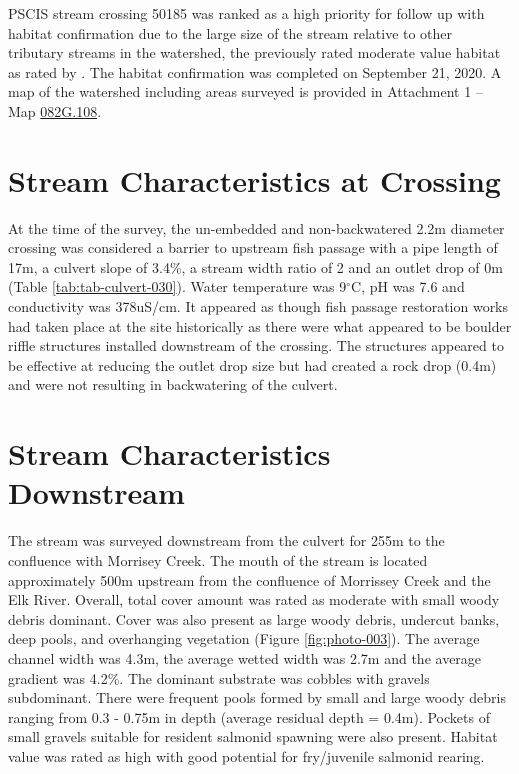 \documentclass[
]{book}
\begin{document}
PSCIS stream crossing 50185 was ranked as a high priority for follow up with habitat confirmation due to the large size of the stream relative to other tributary streams in the watershed, the previously rated moderate value habitat as rated by \citet{vastFishPassage2013}. The habitat confirmation was completed on September 21, 2020. A map of the watershed including areas surveyed is provided in Attachment 1 -- Map \href{https://hillcrestgeo.ca/outgoing/fishpassage/projects/elk/FishPassage_082G.108.pdf}{082G.108}.

\hypertarget{stream-characteristics-at-crossing-2}{%
\section*{Stream Characteristics at Crossing}\label{stream-characteristics-at-crossing-2}}

At the time of the survey, the un-embedded and non-backwatered 2.2m diameter crossing was considered a barrier to upstream fish passage with a pipe length of 17m, a culvert slope of 3.4\%, a stream width ratio of 2 and an outlet drop of 0m (Table \ref{tab:tab-culvert-030}). Water temperature was 9\(^\circ\)C, pH was 7.6 and conductivity was 378uS/cm. It appeared as though fish passage restoration works had taken place at the site historically as there were what appeared to be boulder riffle structures installed downstream of the crossing. The structures appeared to be effective at reducing the outlet drop size but had created a rock drop (0.4m) and were not resulting in backwatering of the culvert.

\hypertarget{stream-characteristics-downstream-2}{%
\section*{Stream Characteristics Downstream}\label{stream-characteristics-downstream-2}}

The stream was surveyed downstream from the culvert for 255m to the confluence with Morrisey Creek. The mouth of the stream is located approximately 500m upstream from the confluence of Morrissey Creek and the Elk River. Overall, total cover amount was rated as moderate with small woody debris dominant. Cover was also present as large woody debris, undercut banks, deep pools, and overhanging vegetation (Figure \ref{fig:photo-003}). The average channel width was 4.3m, the average wetted width was 2.7m and the average gradient was 4.2\%. The dominant substrate was cobbles with gravels subdominant. There were frequent pools formed by small and large woody debris ranging from 0.3 - 0.75m in depth (average residual depth = 0.4m). Pockets of small gravels suitable for resident salmonid spawning were also present. Habitat value was rated as high with good potential for fry/juvenile salmonid rearing.
\end{document}
